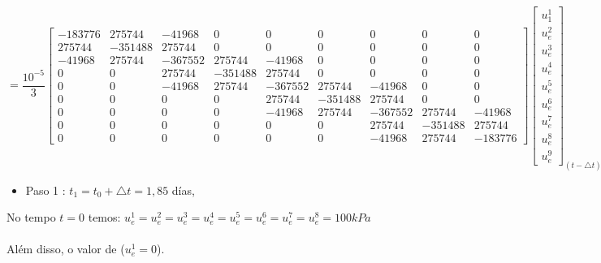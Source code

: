 \documentclass{article} %
\begin{document}
\begin{equation*}
=\frac{10^{-5}}{3}\begin{bmatrix}
-183776&275744&-41968&0&0&0&0&0&0\\
275744&-351488&275744& 0& 0& 0& 0& 0& 0\\
-41968&275744&-367552&275744&-41968& 0& 0& 0& 0\\
0&0&275744&-351488&275744& 0& 0& 0& 0\\
0&0&-41968&275744&-367552&275744&-41968& 0& 0\\
0&0&0&0&275744&-351488&275744& 0& 0\\
0&0&0&0&-41968&275744&-367552&275744&-41968\\
0&0&0&0&0&0&275744&-351488&275744\\
0&0&0&0&0&0&-41968&275744&-183776
\end{bmatrix}\begin{bmatrix}
u_1^1\\
u_e^2\\
u_e^3\\
u_e^4\\
u_e^5\\
u_e^6\\
u_e^7\\
u_e^8\\
u_e^9
\end{bmatrix}_{(t-\triangle t)}
\end{equation*}
\begin{itemize}
	\item Paso 1 : \(t_1=t_0+\triangle t=1,85\) días,
\end{itemize}

No tempo \(t=0\) temos: \(u_e^1=u_e^2=u_e^3=u_e^4=u_e^5=u_e^6=u_e^7=u_e^8=100kPa\)\\
\\
\indent Além disso, o valor de (\(u_e^1=0\)).\\
\end{document}
